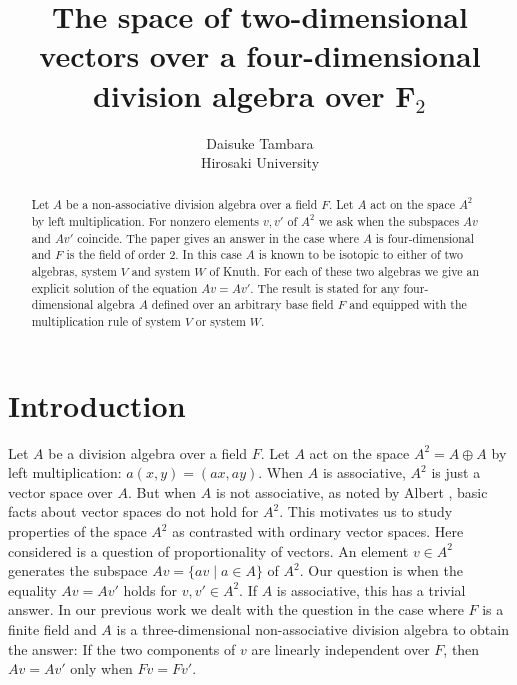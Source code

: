 \documentclass{article}
\newcommand{\bF}{\mathbf{F}}
\begin{document}
\title{The space of two-dimensional vectors over a four-dimensional division algebra over $\bF_2$}

\author{Daisuke Tambara\\
Hirosaki University}

\date{}

\maketitle

\begin{abstract}
 Let $A$ be a non-associative division algebra over a field $F$. Let $A$ act on the space $A^2$ by left multiplication. For nonzero elements $v, v'$ of $A^2$ we ask when the subspaces $Av$ and $Av'$ coincide. The paper gives an answer in the case where $A$ is four-dimensional and $F$ is the field of order 2.
In this case $A$ is known to be isotopic to either of two algebras,  system $V$ and system $W$ of Knuth. 
For each of these two algebras we give an explicit solution of the equation $Av=Av'$. The result is stated for any four-dimensional algebra $A$ defined over an arbitrary base field $F$ and equipped with the  multiplication rule of system $V$ or system $W$.

\end{abstract}

\section*{Introduction}

\medskip
Let $A$ be a division algebra  over a field $F$. 
Let $A$ act on the space $A^2=A\oplus A$ by left multiplication: 
$a(x,y)=(ax,ay)$. When $A$ is associative, $A^2$ is just a vector space over $A$.
But when $A$ is not associative,  as noted by Albert \cite{Alb},  basic facts about vector spaces do not hold for $A^2$.
This motivates us to study  properties of the space $A^2$ as contrasted with ordinary vector spaces.
Here considered is a question of proportionality of vectors.
An element $v \in A^2$ generates the subspace $Av=\{av\mid a\in A\}$ of $A^2$.
Our  question is when the equality $Av=Av'$ holds for $v,v'\in A^2$.
If $A$ is associative, this has a trivial answer.
In our previous work \cite{Tam} we dealt with the question in the case where $F$ is a finite field and $A$ is a three-dimensional non-associative division algebra to obtain the answer:
If the two components of $v$ are linearly independent over $F$, then $Av=Av'$ only when $Fv=Fv'$. 
\end{document}
